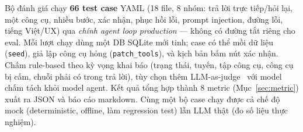 Bộ đánh giá chạy \textbf{66 test case} YAML (18 file, 8 nhóm: trả lời trực
tiếp/hỏi lại, một công cụ, nhiều bước, xác nhận, phục hồi lỗi, prompt
injection, đường lỗi, tiếng Việt/UX) qua \emph{chính agent loop production}
--- không có đường tắt riêng cho eval. Mỗi lượt chạy dùng một DB SQLite mới
tinh; case có thể mồi dữ liệu (\texttt{seed}), giả lập công cụ hỏng
(\texttt{patch\_tools}), và kịch bản bấm nút xác nhận. Chấm rule-based theo kỳ
vọng khai báo (trạng thái, tuyến, tập công cụ, công cụ bị cấm, chuỗi phải có
trong trả lời), tùy chọn thêm LLM-as-judge~\cite{zheng2023judge} với model
chấm tách khỏi model agent. Kết quả tổng hợp thành 8 metric
(Mục~\ref{sec:metric}) xuất ra JSON và báo cáo markdown. Cùng một bộ case
chạy được cả chế độ mock (deterministic, offline, làm regression test) lẫn
LLM thật (đo số liệu thực nghiệm).
